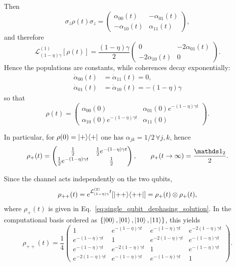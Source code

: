 Then
\begin{equation}
	\sigma_z\rho(t)\sigma_z=
	\begin{pmatrix}
		\alpha_{00}(t) & -\alpha_{01}(t)\\
		-\alpha_{10}(t) & \alpha_{11}(t)
	\end{pmatrix},
\end{equation}
and therefore
\begin{equation}
	\mathcal{L}^{(1)}_{(1-\eta)\gamma}[\rho(t)]
	=
	\frac{(1-\eta)\gamma}{2}
	\begin{pmatrix}
		0 & -2\alpha_{01}(t)\\
		-2\alpha_{10}(t) & 0
	\end{pmatrix}.
\end{equation}
Hence the populations are constants, while coherences decay exponentially:
\begin{align}
	\dot{\alpha}_{00}(t)&= \dot{\alpha}_{11}(t)=0,\\
	\dot{\alpha}_{01}(t)&= \dot{\alpha}_{10}(t)=-(1-\eta)\gamma
\end{align}
so that
\begin{equation}
	\rho(t)=
	\begin{pmatrix}
		\alpha_{00}(0) & \alpha_{01}(0)e^{-(1-\eta)\gamma t}\\
		\alpha_{10}(0)e^{-(1-\eta)\gamma t} & \alpha_{11}(0)
	\end{pmatrix}.
	\label{eq:single_qubit_dephasing_solution}
\end{equation}

In particular, for $\rho(0)=\ket{+}\!\bra{+}$ one has $\alpha_{jk}=1/2 \,\forall j,k$, hence
\begin{equation}
	\rho_{+}(t)=
	\begin{pmatrix}
		\frac{1}{2} & \frac{1}{2}e^{-(1-\eta)\gamma t}\\[2pt]
		\frac{1}{2}e^{-(1-\eta)\gamma t} & \frac{1}{2}
	\end{pmatrix},
	\qquad
	\rho_{+}(t\to\infty)=\frac{\id_2}{2}.
\end{equation}

Since the channel acts independently on the two qubits,
\begin{equation}
	\rho_{++}(t)
	=
	e^{\mathcal{L}^{(2)}_{(1-\eta)\gamma}t}\!\left[\ket{++}\!\bra{++}\right]
	=
	\rho_{+}(t)\otimes\rho_{+}(t),
\end{equation}
where $\rho_{+}(t)$ is given in Eq.~\eqref{eq:single_qubit_dephasing_solution}.
In the computational basis ordered as $\{\ket{00},\ket{01},\ket{10},\ket{11}\}$, this yields
\begin{equation}
	\rho_{++}(t)
	=
	\frac{1}{4}
	\begin{pmatrix}
		1 & e^{-(1-\eta)\gamma t} & e^{-(1-\eta)\gamma t} & e^{-2(1-\eta)\gamma t}\\
		e^{-(1-\eta)\gamma t} & 1 & e^{-2(1-\eta)\gamma t} & e^{-(1-\eta)\gamma t}\\
		e^{-(1-\eta)\gamma t} & e^{-2(1-\eta)\gamma t} & 1 & e^{-(1-\eta)\gamma t}\\
		e^{-2(1-\eta)\gamma t} & e^{-(1-\eta)\gamma t} & e^{-(1-\eta)\gamma t} & 1
	\end{pmatrix}.
	\label{eq:rho_pp_dephasing}
\end{equation}

